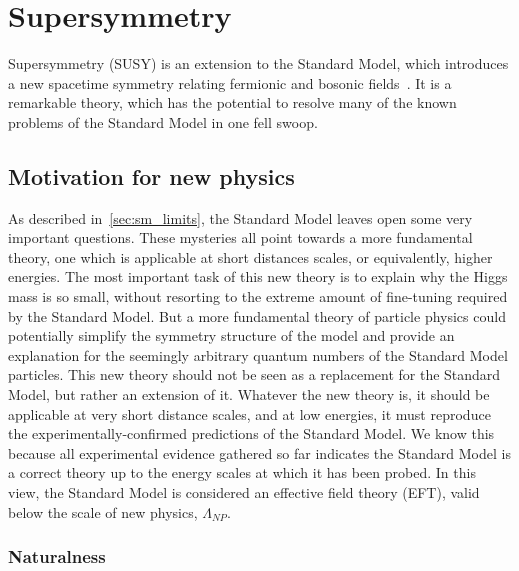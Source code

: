 \chapter{Supersymmetry} \label{ch:susy}

Supersymmetry (SUSY) is an extension to the Standard Model, which introduces a new spacetime symmetry relating fermionic and bosonic fields~\cite{sm-pdg-dark-matter}.
It is a remarkable theory, which has the potential to resolve many of the known problems of the Standard Model in one fell swoop.

\section{Motivation for new physics}\label{sec:susy_motivation}

As described in~\ref{sec:sm_limits}, the Standard Model leaves open some very important questions.
These mysteries all point towards a more fundamental theory, one which is applicable at short distances scales, or equivalently, higher energies.
The most important task of this new theory is to explain why the Higgs mass is so small, without resorting to the extreme amount of fine-tuning required by the Standard Model.
But a more fundamental theory of particle physics could potentially simplify the symmetry structure of the model and provide an explanation for the seemingly arbitrary quantum numbers of the Standard Model particles.
This new theory should not be seen as a replacement for the Standard Model, but rather an extension of it.
Whatever the new theory is, it should be applicable at very short distance scales, and at low energies, it must reproduce the experimentally-confirmed predictions of the Standard Model.
We know this because all experimental evidence gathered so far indicates the Standard Model is a correct theory up to the energy scales at which it has been probed.
In this view, the Standard Model is considered an effective field theory (EFT), valid below the scale of new physics, $\Lambda_{NP}$.

\subsection{Naturalness}\label{subsec:susy_naturalness}

